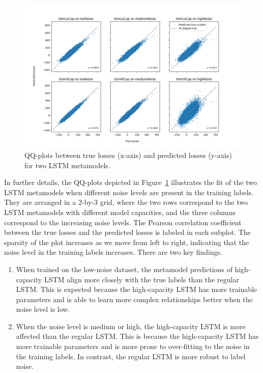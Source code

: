 \begin{figure}[ht!]
    \centering
    \includegraphics[width=\textwidth]{./project2/figures/qqPlots/lstmAll.png}
    \caption{QQ-plots between true losses (x-axis) and predicted losses (y-axis) for two LSTM metamodels.} 
    \label{fig2:QQ_All}
\end{figure}

In further details, the QQ-plots depicted in Figure~\ref{fig2:QQ_All} illustrates the fit of the two LSTM metamodels when different noise levels are present in the training labels.
They are arranged in a 2-by-3 grid, where the two rows correspond to the two LSTM metamodels with different model capacities, and the three columns correspond to the increasing noise levels.
The Pearson correlation coefficient between the true losses and the predicted losses is labeled in each subplot.
The sparsity of the plot increases as we move from left to right, indicating that the noise level in the training labels increases.
There are two key findings.
\begin{enumerate}
    \item   When trained on the low-noise dataset, the metamodel predictions of high-capacity LSTM align more closely with the true labels than the regular LSTM.
    This is expected because the high-capacity LSTM has more trainable parameters and is able to learn more complex relationships better when the noise level is low.
    \item   When the noise level is medium or high, the high-capacity LSTM is more affected than the regular LSTM.
    This is because the high-capacity LSTM has more trainable parameters and is more prone to over-fitting to the noise in the training labels.
    In contrast, the regular LSTM is more robust to label noise.
\end{enumerate}

